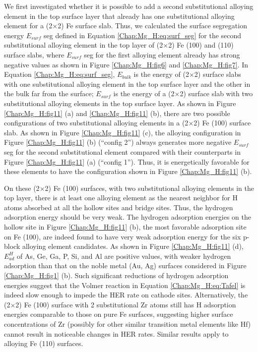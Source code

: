 We first investigated whether it is possible to add a second substitutional alloying element in the top surface layer that already has one substitutional alloying element for a (2$\times$2) Fe surface slab. Thus, we calculated the surface segregation energy $E_{surf}$ seg defined in Equation \ref{Chap:Mg_H:eq:surf_seg} for the second substitutional alloying element in the top layer of (2$\times$2) Fe (100) and (110) surface slabs, where $E_{surf}$ seg for the first alloying element already has strong negative values as shown in Figure \ref{Chap:Mg_H:fig6} and \ref{Chap:Mg_H:fig7}. In Equation \ref{Chap:Mg_H:eq:surf_seg}, $E_{bulk}$ is the energy of (2$\times$2) surface slabs with one substitutional alloying element in the top surface layer and the other in the bulk far from the surface; $E_{surf}$ is the energy of a (2$\times$2) surface slab with two substitutional alloying elements in the top surface layer. As shown in Figure \ref{Chap:Mg_H:fig11} (a) and \ref{Chap:Mg_H:fig11} (b), there are two possible configurations of two substitutional alloying elements in a (2$\times$2) Fe (100) surface slab. As shown in Figure \ref{Chap:Mg_H:fig11} (c), the alloying configuration in Figure \ref{Chap:Mg_H:fig11} (b) (``config 2'') always generates more negative $E_{surf}$ seg for the second substitutional element compared with their counterparts in Figure \ref{Chap:Mg_H:fig11} (a) (``config 1''). Thus, it is energetically favorable for these elements to have the configuration shown in Figure \ref{Chap:Mg_H:fig11} (b).


On these (2$\times$2) Fe (100) surfaces, with two substitutional alloying elements in the top layer, there is at least one alloying element as the nearest neighbor for H atoms absorbed at all the hollow sites and bridge sites. Thus, the hydrogen adsorption energy should be very weak. The hydrogen adsorption energies on the hollow site in Figure \ref{Chap:Mg_H:fig11} (b), the most favorable adsorption site on Fe (100), are indeed found to have very weak adsorption energy for the six p-block alloying element candidates. As shown in Figure \ref{Chap:Mg_H:fig11} (d), $E_{ad}^H$ of As, Ge, Ga, P, Si, and Al are positive values, with weaker hydrogen adsorption than that on the noble metal (Au, Ag) surfaces considered in Figure \ref{Chap:Mg_H:fig1} (b). Such significant reductions of hydrogen adsorption energies suggest that the Volmer reaction in Equation \ref{Chap:Mg_H:eq:Tafel} is indeed slow enough to impede the \ac{HER} rate on cathode sites. Alternatively, the (2$\times$2) Fe (100) surface with 2 substitutional Zr atoms still has H adsorption energies comparable to those on pure Fe surfaces, suggesting higher surface concentrations of Zr (possibly for other similar transition metal elements like Hf) cannot result in noticeable changes in \ac{HER} rates. Similar results apply to alloying Fe (110) surfaces.


